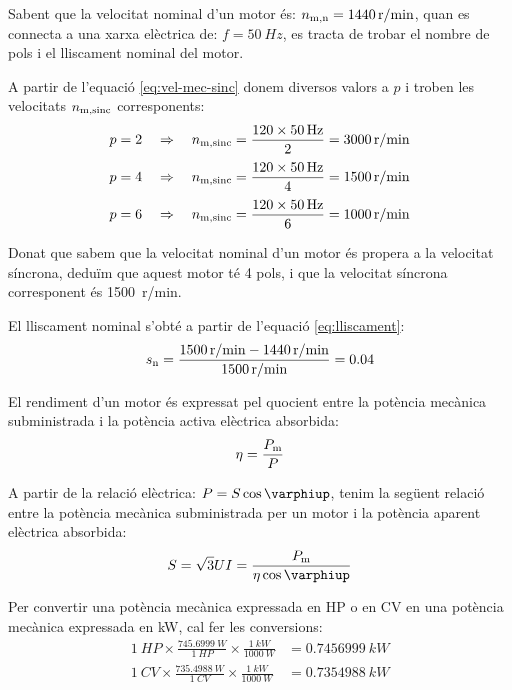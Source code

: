 \begin{exemple}
    Sabent que la velocitat nominal d'un motor és: $n_\mathrm{m,n} = \SI{1440}{r/min}$, quan es connecta a una xarxa elèctrica de: $f = \SI{50}{Hz}$,  es tracta de trobar el nombre de pols i el lliscament nominal del motor.

    A partir de l'equació \eqref{eq:vel-mec-sinc} donem diversos valors a $p$ i troben les velocitats $n_\mathrm{m,sinc}$ corresponents:
    \begin{align*}
      p = 2 \quad  &\Rightarrow \quad n_\mathrm{m,sinc} = \frac{120 \times \SI{50}{Hz}}{2} = \SI{3000}{r/min}\\[0.5ex]
      p = 4 \quad  &\Rightarrow \quad n_\mathrm{m,sinc} = \frac{120 \times \SI{50}{Hz}}{4} = \SI{1500}{r/min}\\[0.5ex]
      p = 6 \quad  &\Rightarrow \quad n_\mathrm{m,sinc} = \frac{120 \times \SI{50}{Hz}}{6} = \SI{1000}{r/min}
    \end{align*}

    Donat que sabem que la velocitat nominal d'un motor és propera a la velocitat síncrona, deduïm que aquest motor té 4 pols, i que la velocitat síncrona corresponent és \SI{1500}{r/min}.

    El lliscament nominal s'obté a partir de l'equació \eqref{eq:lliscament}:
    \[
      s_\mathrm{n} = \frac{\SI{1500}{r/min} - \SI{1440}{r/min}}{\SI{1500}{r/min}} = \num{0,04}
    \]
\end{exemple}

El rendiment d'un motor és expressat pel quocient entre la potència mecànica subministrada i la potència activa elèctrica absorbida:
\begin{equation}\index{rendiment}\index{potència mecànica}
    \eta = \frac{P\ped{m}}{P}
\end{equation}

A partir de la relació elèctrica: $P = S \cos\varphiup$, tenim la següent relació entre la potència mecànica subministrada per un motor i la potència aparent elèctrica absorbida:
\begin{equation}
    S = \sqrt{3} U I = \frac{P\ped{m}}{\eta \cos\varphiup}\label{eq:mot-S-Pm}
\end{equation}

Per  convertir una potència mecànica expressada en HP o en CV en una  potència mecànica expressada en kW, cal  fer les conversions:
\begin{subequations}
\begin{align}
  \SI{1}{HP} \times \frac{\SI{745,6999}{W}}{\SI{1}{HP}} \times \frac{\SI{1}{kW}}{\SI{1000}{W}} &= \SI{0,7456999}{kW} \\[1ex]
  \SI{1}{CV} \times \frac{\SI{735,4988}{W}}{\SI{1}{CV}} \times \frac{\SI{1}{kW}}{\SI{1000}{W}} &= \SI{0,7354988}{kW}
\end{align}
\end{subequations}

